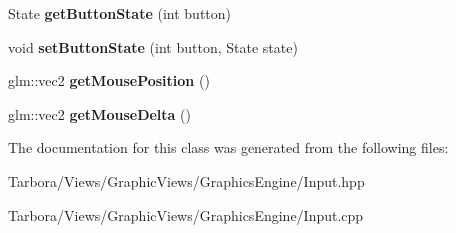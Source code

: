 \begin{DoxyCompactItemize}
State {\bfseries get\+Button\+State} (int button)
\item 
\mbox{\label{classTarbora_1_1Input_a22c4a063b5598a1612148ad1fd1f42dc}} 
void {\bfseries set\+Button\+State} (int button, State state)
\item 
\mbox{\label{classTarbora_1_1Input_ad102366d6acc777674c6b999bf473d26}} 
glm\+::vec2 {\bfseries get\+Mouse\+Position} ()
\item 
\mbox{\label{classTarbora_1_1Input_a7088612cd145e5e6ca7532756ef3e277}} 
glm\+::vec2 {\bfseries get\+Mouse\+Delta} ()
\end{DoxyCompactItemize}


The documentation for this class was generated from the following files\+:\begin{DoxyCompactItemize}
\item 
Tarbora/\+Views/\+Graphic\+Views/\+Graphics\+Engine/Input.\+hpp\item 
Tarbora/\+Views/\+Graphic\+Views/\+Graphics\+Engine/Input.\+cpp\end{DoxyCompactItemize}
